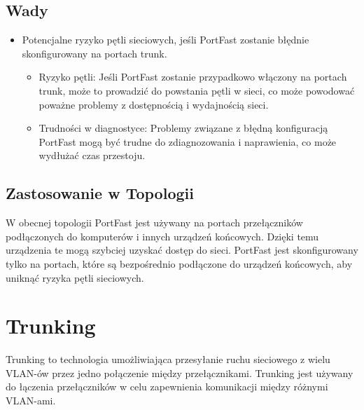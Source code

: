 \subsection{Wady}
\begin{itemize}
    \item Potencjalne ryzyko pętli sieciowych, jeśli PortFast zostanie błędnie skonfigurowany na portach trunk.
    \begin{itemize}
        \item Ryzyko pętli: Jeśli PortFast zostanie przypadkowo włączony na portach trunk, może to prowadzić do powstania pętli w sieci, co może powodować poważne problemy z dostępnością i wydajnością sieci.
        \item Trudności w diagnostyce: Problemy związane z błędną konfiguracją PortFast mogą być trudne do zdiagnozowania i naprawienia, co może wydłużać czas przestoju.
    \end{itemize}
\end{itemize}

\subsection{Zastosowanie w Topologii}
W obecnej topologii PortFast jest używany na portach przełączników podłączonych do komputerów i innych urządzeń końcowych. Dzięki temu urządzenia te mogą szybciej uzyskać dostęp do sieci. PortFast jest skonfigurowany tylko na portach, które są bezpośrednio podłączone do urządzeń końcowych, aby uniknąć ryzyka pętli sieciowych.

\section{Trunking}

Trunking to technologia umożliwiająca przesyłanie ruchu sieciowego z wielu VLAN-ów przez jedno połączenie między przełącznikami. Trunking jest używany do łączenia przełączników w celu zapewnienia komunikacji między różnymi VLAN-ami.

